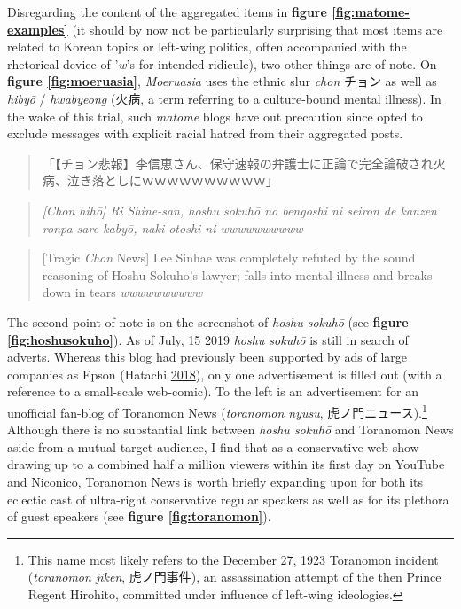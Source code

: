 \documentclass[10pt,british,A4paper,,openany]{memoir}
\begin{document}
Disregarding the content of the aggregated items in \textbf{figure
\ref{fig:matome-examples}} (it should by now not be particularly
surprising that most items are related to Korean topics or left-wing
politics, often accompanied with the rhetorical device of '\emph{w}'s
for intended ridicule), two other things are of note. On \textbf{figure
\ref{fig:moeruasia}}, \emph{Moeruasia} uses the ethnic slur \emph{chon}
チョン as well as \emph{hibyō} / \emph{hwabyeong} (火病, a term
referring to a culture-bound mental illness). In the wake of this trial,
such \emph{matome} blogs have out precaution since opted to exclude
messages with explicit racial hatred from their aggregated posts.

\begin{quote}
「【チョン悲報】李信恵さん、保守速報の弁護士に正論で完全論破され火病、泣き落としにｗｗｗｗｗｗｗｗｗｗ」
\end{quote}

\begin{quote}
\emph{{[}Chon hihō{]} Ri Shine-san, hoshu sokuhō no bengoshi ni seiron
de kanzen ronpa sare kabyō, naki otoshi ni wwwwwwwwww}
\end{quote}

\begin{quote}
{[}Tragic \emph{Chon} News{]} Lee Sinhae was completely refuted by the
sound reasoning of Hoshu Sokuho's lawyer; falls into mental illness and
breaks down in tears \emph{wwwwwwwwww}
\end{quote}

The second point of note is on the screenshot of \emph{hoshu sokuhō}
(see \textbf{figure \ref{fig:hoshusokuho}}). As of July, 15 2019
\emph{hoshu sokuhō} is still in search of adverts. Whereas this blog had
previously been supported by ads of large companies as Epson (Hatachi
\protect\hyperlink{ref-hatachi__2018}{2018}), only one advertisement is
filled out (with a reference to a small-scale web-comic). To the left is
an advertisement for an unofficial fan-blog of Toranomon News
(\emph{toranomon nyūsu}, 虎ノ門ニュース).\footnote{This name most likely
  refers to the December 27, 1923 Toranomon incident (\emph{toranomon
  jiken}, 虎ノ門事件), an assassination attempt of the then Prince
  Regent Hirohito, committed under influence of left-wing ideologies.}
Although there is no substantial link between \emph{hoshu sokuhō} and
Toranomon News aside from a mutual target audience, I find that as a
conservative web-show drawing up to a combined half a million viewers
within its first day on YouTube and Niconico, Toranomon News is worth
briefly expanding upon for both its eclectic cast of ultra-right
conservative regular speakers as well as for its plethora of guest
speakers (see \textbf{figure \ref{fig:toranomon}}).
\end{document}
